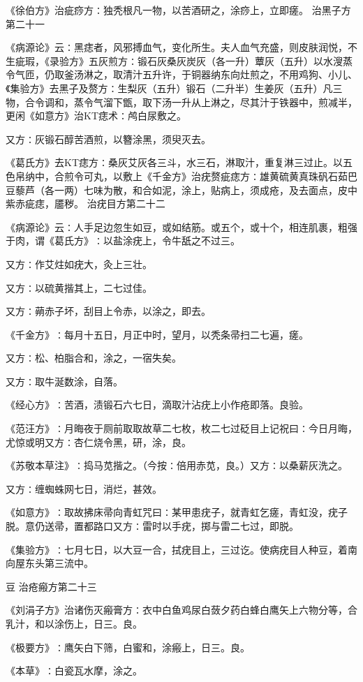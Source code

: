 \documentclass[a4paper,12pt,UTF8,twoside]{ctexbook}
\begin{document}
《徐伯方》治疵痧方∶独秃根凡一物，以苦酒研之，涂痧上，立即瘥。
治黑子方第二十一

《病源论》云∶黑痣者，风邪搏血气，变化所生。夫人血气充盛，则皮肤润悦，不生疵瑕，《录验方》五灰煎方∶锻石灰桑灰炭灰（各一升）蕈灰（五升）以水溲蒸令气匝，仍取釜汤淋之，取清汁五升许，于铜器纳东向灶煎之，不用鸡狗、小儿、《集验方》去黑子及赘方∶生梨灰（五升）锻石（二升半）生姜灰（五升）凡三物，合令调和，蒸令气溜下甑，取下汤一升从上淋之，尽其汁于铁器中，煎减半，更闲《如意方》治KT痣术∶鸬白尿敷之。

又方∶灰锻石醇苦酒煎，以簪涂黑，须臾灭去。

《葛氏方》去KT痣方∶桑灰艾灰各三斗，水三石，淋取汁，重复淋三过止。以五色帛纳中，合煎令可丸，以敷上《千金方》治疣赘疵痣方∶雄黄硫黄真珠矾石茹巴豆藜芦（各一两）七味为散，和合如泥，涂上，贴病上，须成疮，及去面点，皮中紫赤疵痣，靥秽。
治疣目方第二十二

《病源论》云∶人手足边忽生如豆，或如结筋。或五个，或十个，相连肌裹，粗强于肉，谓《葛氏方》∶以盐涂疣上，令牛舐之不过三。

又方∶作艾炷如疣大，灸上三壮。

又方∶以硫黄揩其上，二七过佳。

又方∶蒴赤子坏，刮目上令赤，以涂之，即去。

《千金方》∶每月十五日，月正中时，望月，以秃条帚扫二七遍，瘥。

又方∶松、柏脂合和，涂之，一宿失矣。

又方∶取牛涎数涂，自落。

《经心方》∶苦酒，渍锻石六七日，滴取汁沾疣上小作疮即落。良验。

《范汪方》∶月晦夜于厕前取取故草二七枚，枚二七过砭目上记祝曰∶今日月晦，尤惊或明又方∶杏仁烧令黑，研，涂，良。

《苏敬本草注》∶捣马苋揩之。（今按∶倍用赤苋，良。）又方∶以桑薪灰洗之。

又方∶缠蜘蛛网七日，消烂，甚效。

《如意方》∶取故拂床帚向青虹咒曰∶某甲患疣子，就青虹乞瘥，青虹没，疣子脱。意仍送帚，置都路口又方∶雷时以手疣，掷与雷二七过，即脱。

《集验方》∶七月七日，以大豆一合，拭疣目上，三过讫。使病疣目人种豆，着南向屋东头第三流中。

豆
治疮瘢方第二十三

《刘涓子方》治诸伤灭瘢膏方∶衣中白鱼鸡尿白蔹夕药白蜂白鹰矢上六物分等，合乳汁，和以涂伤上，日三。良。

《极要方》∶鹰矢白下筛，白蜜和，涂瘢上，日三。良。

《本草》∶白瓷瓦水摩，涂之。
\end{document}
